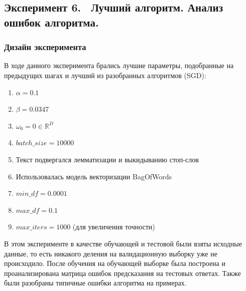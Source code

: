 \subsection{Эксперимент 6.  Лучший алгоритм. Анализ ошибок алгоритма.}
\subsubsection{Дизайн эксперимента}
В ходе данного эксперимента брались лучшие параметры, подобранные на предыдущих шагах и лучший из разобранных алгоритмов (SGD):
\begin{enumerate}
	\item $\alpha = 0.1$
	\item  $\beta = 0.0347$
	\item  $\omega_0 = 0 \in \mathbb{R}^D$
	\item  $batch\_size = 10000 $
	\item Текст подвергался лемматизации и выкидыванию стоп-слов
	\item Использовалась модель векторизации BagOfWords
	\item $min\_df = 0.0001$
	\item $max\_df = 0.1$
	\item $max\_iters = 1000$ (для увеличения точности)
\end{enumerate}
В этом эксперименте в качестве обучающей и тестовой были взяты исходные данные, то есть никакого деления на валидационную выборку уже не происходило. После обучения на обучающей выборке была построена и проанализирована матрица ошибок предсказания на тестовых ответах. Также были разобраны типичные ошибки алгоритма на примерах.
\newpage
